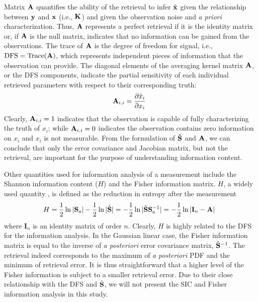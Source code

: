 Matrix $\mathbf{A}$ quantifies the ability of the retrieval to infer
$\hat{\mathbf{x}}$ given the relationship between $\mathbf{y}$ and $\mathbf{x}$ (i.e.,
$\mathbf{K}$) and given the observation noise and \textit{a priori} characterization. 
Thus, $\mathbf{A}$ represents a perfect retrieval if it is the identity matrix or,
if $\mathbf{A}$ is the null matrix, indicates that no information can be gained
from the observations. The trace of $\mathbf{A}$ is the
degree of freedom for signal, i.e., $\text{DFS}=\text{Trace}(\mathbf{A})$, 
which represents independent pieces of information that the observation 
can provide. The diagonal elements of the averaging kernel matrix $\mathbf{A}$, 
or the DFS components, indicate the partial sensitivity of each 
individual retrieved parameters with respect to their corresponding truth: 
\begin{equation}
\mathbf{A}_{i,i}=\frac{\partial\hat{x}_i}{\partial x_i}
\end{equation}
Clearly, $\mathbf{A}_{i,i}=1$ indicates that the observation is capable
of fully characterizing the truth of $x_i$; while $\mathbf{A}_{i,i}=0$ 
indicates the observation contains zero information on $x_i$ and $x_i$ 
is not measurable. From the formulation of $\hat{\mathbf{S}}$ and $\mathbf{A}$, 
we can conclude that only the error covariance and Jacobian matrix, 
but not the retrieval, are important for the purpose of understanding 
information content.

Other quantities used for information analysis of a measurement include
the Shannon information content ($H$) \citep{Shannon48} and the Fisher
information matrix. $H$, a widely used quantity \citep[e.g.,][]{Rodgers98,
Knobelspiesse12}, is defined as the reduction in entropy after 
the measurement
\begin{equation}
H=\frac{1}{2}\ln{|\mathbf{S}_\text{a}|}-\frac{1}{2}\ln{|\hat{\mathbf{S}}|}
 =-\frac{1}{2}\ln{|\hat{\mathbf{S}}\mathbf{S}_\text{a}^{-1}|}
 =-\frac{1}{2}\ln{|\mathbf{I}_n-\mathbf{A}|}
\end{equation}
where $\mathbf{I}_n$ is an identity matrix of order $n$. Clearly, 
$H$ is highly related to the DFS for the information analysis. 
In the Gaussian linear case, the Fisher information matrix is equal 
to the inverse of \textit{a posteriori} error covariance matrix, 
$\hat{\mathbf{S}}^{-1}$. The retrieval indeed corresponds to the maximum 
of \textit{a posteriori} PDF and the minimum of retrieval error. It is thus 
straightforward that a higher level of the Fisher information is 
subject to a smaller retrieval error. Due to their close 
relationship with the DFS and $\hat{\mathbf{S}}$, we will not present 
the SIC and Fisher information analysis in this study. 

